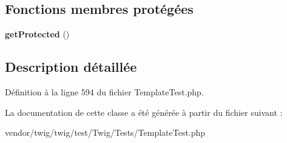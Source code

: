 \subsection*{Fonctions membres protégées}
\begin{DoxyCompactItemize}
\item 
{\bfseries get\+Protected} ()\hypertarget{class_twig___template_method_object_a9b71ffe632b69232be238a69ffb3b32f}{}\label{class_twig___template_method_object_a9b71ffe632b69232be238a69ffb3b32f}

\end{DoxyCompactItemize}


\subsection{Description détaillée}


Définition à la ligne 594 du fichier Template\+Test.\+php.



La documentation de cette classe a été générée à partir du fichier suivant \+:\begin{DoxyCompactItemize}
\item 
vendor/twig/twig/test/\+Twig/\+Tests/Template\+Test.\+php\end{DoxyCompactItemize}
